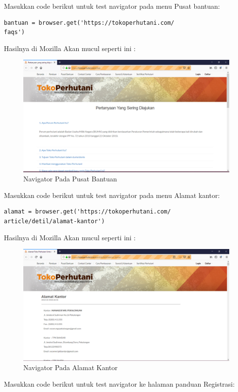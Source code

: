 Masukkan code berikut untuk test navigator pada menu  Pusat bantuan:
\begin{verbatim}
bantuan = browser.get('https://tokoperhutani.com/
faqs')
\end{verbatim}

Hasilnya  di Mozilla Akan mucul seperti ini :
\begin{figure}[h]
	\centering
	\includegraphics[scale=0.3]{figures/2hasil.PNG}
	\caption{Navigator Pada Pusat Bantuan}
\end{figure}

Masukkan code berikut untuk test navigator pada menu  Alamat kantor:
\begin{verbatim}
alamat = browser.get('https://tokoperhutani.com/
article/detil/alamat-kantor')
\end{verbatim}

Hasilnya  di Mozilla Akan mucul seperti ini :
\begin{figure}[h]
	\centering
	\includegraphics[scale=0.3]{figures/3hasil.PNG}
	\caption{Navigator Pada Alamat Kantor}
\end{figure}


Masukkan code berikut untuk test navigator ke halaman panduan Registrasi:


